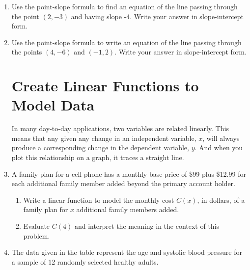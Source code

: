 \documentclass[11pt]{article}
\begin{document}
\vspace{-.1in}
\begin{enumerate}
\item Use the point-slope formula to find an equation of the line passing through the point $(2,-3)$ and having slope -4.  Write your answer in slope-intercept form.\\[1.5in]









\item Use the point-slope formula to write an equation of the line passing through the points $(4,-6)$ and $(-1,2)$.  Write your answer in slope-intercept form.\\[3in]



\newpage


\section{Create Linear Functions to Model Data}
\noindent In many day-to-day applications, two variables are related linearly.  This means that any given any change in an independent variable, $x$, will always produce a corresponding change in the dependent variable, $y$.  And when you plot this relationship on a graph, it traces a straight line.\\

\item A family plan for a cell phone has a monthly base price of \$99 plus \$12.99 for each additional family member added beyond the primary account holder.
\begin{enumerate}
\item Write a linear function to model the monthly cost $C(x)$, in dollars, of a family plan for $x$ additional family members added.\\[1in]
\item Evaluate $C(4)$ and interpret the meaning in the context of this problem.\\[1in]
\end{enumerate}




\item The data given in the table represent the age and systolic blood pressure for a sample of 12 randomly selected healthy adults.\\
\begin{table}[h]
\centering


\end{table}
\end{enumerate}
\end{document}
